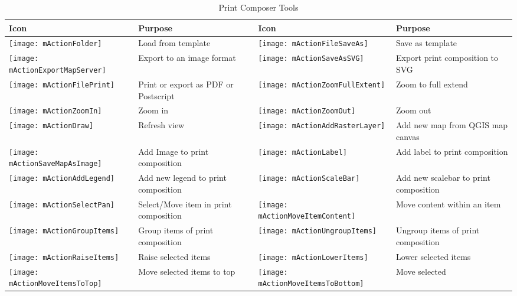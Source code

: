 \begin{table}[h]
\centering
\caption{Print Composer Tools}\label{tab:printcomposer_tools}\medskip
 \begin{tabular}{|l|p{6.9cm}|l|p{6.9cm}|}
 \hline \textbf{Icon} & \textbf{Purpose} & \textbf{Icon} &
 \textbf{Purpose} \\
 \hline \texttt{[image: mActionFolder]}
 & Load from template &
 \texttt{[image: mActionFileSaveAs]} & Save as template \\
 \hline \texttt{[image: mActionExportMapServer]}
 & Export to an image format & 
 \texttt{[image: mActionSaveAsSVG]} & Export print composition 
 to SVG \\
 \hline \texttt{[image: mActionFilePrint]} & Print or 
 export as PDF or Postscript &
 \texttt{[image: mActionZoomFullExtent]} & Zoom to
 full extend \\
 \hline \texttt{[image: mActionZoomIn]} & Zoom in &
 \texttt{[image: mActionZoomOut]} & Zoom out \\
 \hline \texttt{[image: mActionDraw]} & Refresh 
 view &
 \texttt{[image: mActionAddRasterLayer]} & Add 
 new map from QGIS map canvas \\
 \hline \texttt{[image: mActionSaveMapAsImage]} & Add Image to 
 print composition &
 \texttt{[image: mActionLabel]} & Add label to print composition \\
 \hline \texttt{[image: mActionAddLegend]} & Add new legend to 
 print composition & 
 \texttt{[image: mActionScaleBar]} & Add new scalebar to print
 composition\\
 \hline \texttt{[image: mActionSelectPan]} & Select/Move item in 
 print composition &
 \texttt{[image: mActionMoveItemContent]} & Move content within
 an item \\
 \hline \texttt{[image: mActionGroupItems]} & Group items of 
 print composition & 
 \texttt{[image: mActionUngroupItems]} & Ungroup items of print 
 composition \\
 \hline \texttt{[image: mActionRaiseItems]} & Raise selected
 items  &
 \texttt{[image: mActionLowerItems]} & Lower selected items \\
 \hline \texttt{[image: mActionMoveItemsToTop]} & Move selected
 items to top & 
 \texttt{[image: mActionMoveItemsToBottom]} & Move selected

\end{tabular}
\end{table}
